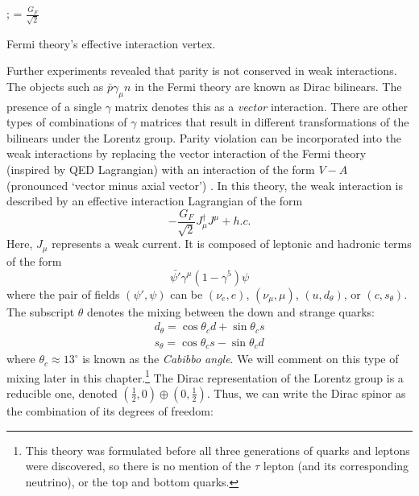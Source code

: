 \begin{marginfigure}
;
= $\frac{G_F}{\sqrt{2}}$
\caption{Fermi theory's effective interaction vertex.}
\end{marginfigure}
Further experiments \citep{Wu:1957my} revealed that parity is not conserved in weak interactions. The objects such as $\bar{p}\gamma_\mu n$ in the Fermi theory are known as Dirac bilinears. The presence of a single $\gamma$ matrix denotes this as a \emph{vector} interaction. There are other types of combinations of $\gamma$ matrices that result in different transformations of the bilinears under the Lorentz group. Parity violation can be incorporated into the weak interactions by replacing the vector interaction of the Fermi theory (inspired by QED Lagrangian)  with an interaction of the form $V-A$ (pronounced `vector minus axial vector') \citep{Lesov2009}. In this theory, the weak interaction is described by an effective interaction Lagrangian of the form
\begin{equation}
-\frac{G_F}{\sqrt{2}}J^\dagger_\mu J^\mu + h.c.
\end{equation}
Here, $J_\mu$ represents a weak current. It is composed of leptonic and hadronic terms of the form 
\begin{equation}\label{eq:v_a_interaction}
\bar{\psi'}\gamma^\mu(1-\gamma^5)\psi
\end{equation}
where the pair of fields $(\psi', \psi)$ can be $(\nu_e, e)$, $(\nu_\mu,\mu)$, $(u, d_\theta)$, or $(c, s_\theta)$. The subscript $\theta$ denotes the mixing between the down and strange quarks: 
  \begin{equation}
    \begin{split}
    d_\theta = \cos\theta_c d + \sin\theta_c s\\
    s_\theta = \cos\theta_c s - \sin\theta_c d
  \end{split}
  \end{equation}
  where $\theta_c \approx 13^\circ$ is known as the \emph{Cabibbo angle}. We will comment on this type of mixing later in this chapter.\footnote{This theory was formulated before all three generations of quarks and leptons were discovered, so there is no mention of the $\tau$ lepton (and its corresponding neutrino), or the top and bottom quarks.}
  The Dirac representation of the Lorentz group is a reducible one, denoted $\left(\frac{1}{2},0\right)\oplus\left(0,\frac{1}{2}\right)$. Thus, we can write the Dirac spinor as the combination of its degrees of freedom:
